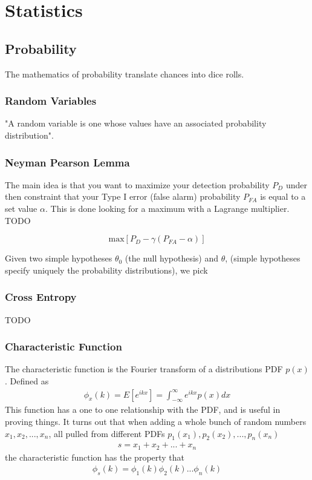 \chapter{Statistics}


\label{ch:statistics}

\section{Probability}
The mathematics of probability translate chances into dice rolls.

\subsection{Random Variables}
"A random variable is one whose values have an associated probability distribution".\cite{grus}

\subsection{Neyman Pearson Lemma}
The main idea is that you want to maximize your detection probability $P_D$ under then constraint that your Type I error (false alarm) probability $P_{FA}$ is equal to a set value $\alpha$. This is done looking for a maximum with a Lagrange multiplier. TODO

\begin{equation}
	\textrm{max}[P_D - \gamma(P_{FA}-\alpha)]
\end{equation}

Given two simple hypotheses $\theta_0$ (the null hypothesis) and $\theta$, (simple hypotheses specify uniquely the probability distributions), we pick 

\subsection{Cross Entropy}
TODO

\subsection{Characteristic Function}
The characteristic function is the Fourier transform of a distributions PDF $p(x)$. Defined as 
\begin{align}
\phi_x(k) = E[e^{ikx}] = \int_{-\infty}^\infty e^{ikx}p(x)dx
\end{align}
This function has a one to one relationship with the PDF, and is useful in proving things. It turns out that when adding a whole bunch of random numbers $x_1, x_2, ..., x_n$, all pulled from different PDFs $p_1(x_1), p_2(x_2), ..., p_n(x_n)$
\begin{align}
s = x_1 + x_2 + ... + x_n
\end{align}
the characteristic function has the property that
\begin{align}
\phi_s(k) =\phi_1(k)\phi_2(k)...\phi_n(k)
\end{align}


